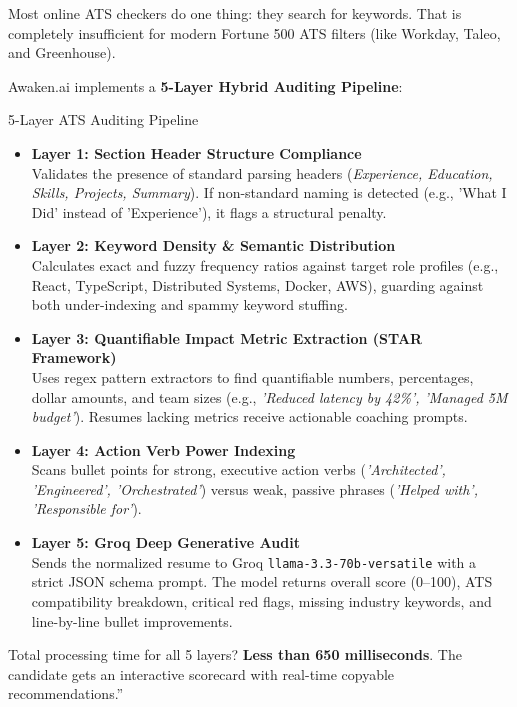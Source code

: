 \documentclass[11pt,a4paper]{article}
\begin{document}
Most online ATS checkers do one thing: they search for keywords. That is completely insufficient for modern Fortune 500 ATS filters (like Workday, Taleo, and Greenhouse). 

Awaken.ai implements a \textbf{5-Layer Hybrid Auditing Pipeline}:

\begin{techbox}{5-Layer ATS Auditing Pipeline}
\begin{itemize}[leftmargin=*]
    \item \textbf{Layer 1: Section Header Structure Compliance} \\
    Validates the presence of standard parsing headers (\textit{Experience, Education, Skills, Projects, Summary}). If non-standard naming is detected (e.g., 'What I Did' instead of 'Experience'), it flags a structural penalty.
    \item \textbf{Layer 2: Keyword Density \& Semantic Distribution} \\
    Calculates exact and fuzzy frequency ratios against target role profiles (e.g., React, TypeScript, Distributed Systems, Docker, AWS), guarding against both under-indexing and spammy keyword stuffing.
    \item \textbf{Layer 3: Quantifiable Impact Metric Extraction (STAR Framework)} \\
    Uses regex pattern extractors to find quantifiable numbers, percentages, dollar amounts, and team sizes (e.g., \textit{'Reduced latency by 42\%', 'Managed \.5M budget'}). Resumes lacking metrics receive actionable coaching prompts.
    \item \textbf{Layer 4: Action Verb Power Indexing} \\
    Scans bullet points for strong, executive action verbs (\textit{'Architected', 'Engineered', 'Orchestrated'}) versus weak, passive phrases (\textit{'Helped with', 'Responsible for'}).
    \item \textbf{Layer 5: Groq Deep Generative Audit} \\
    Sends the normalized resume to Groq \texttt{llama-3.3-70b-versatile} with a strict JSON schema prompt. The model returns overall score (0--100), ATS compatibility breakdown, critical red flags, missing industry keywords, and line-by-line bullet improvements.
\end{itemize}
\end{techbox}

Total processing time for all 5 layers? \textbf{Less than 650 milliseconds}. The candidate gets an interactive scorecard with real-time copyable recommendations.''
\end{document}
